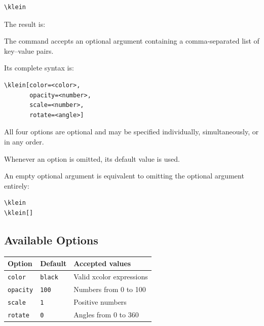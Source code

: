 \documentclass[12pt,a4paper]{article}
\begin{document}
\begin{verbatim}
\klein
\end{verbatim}

The result is:

\begin{center}
    \klein
\end{center}

The command accepts an optional argument containing
a comma-separated list of key--value pairs.

Its complete syntax is:

\begin{verbatim}
\klein[color=<color>,
       opacity=<number>,
       scale=<number>,
       rotate=<angle>]
\end{verbatim}

All four options are optional and may be specified
individually, simultaneously, or in any order.

Whenever an option is omitted, its default value
is used.

An empty optional argument is equivalent to omitting
the optional argument entirely:

\begin{verbatim}
\klein
\klein[]
\end{verbatim}

\begin{center}
    \klein
    \qquad
    \klein[]
\end{center}

\subsection{Available Options}

\begin{center}
\renewcommand{\arraystretch}{1.4}
\begin{tabular}{lll}
\toprule
\textbf{Option}
    & \textbf{Default}
    & \textbf{Accepted values}\\
\midrule
\texttt{color}
    & \texttt{black}
    & Valid xcolor expressions\\
\texttt{opacity}
    & \texttt{100}
    & Numbers from 0 to 100\\
\texttt{scale}
    & \texttt{1}
    & Positive numbers\\
\texttt{rotate}
    & \texttt{0}
    & Angles from 0 to 360\\
\bottomrule
\end{tabular}
\end{center}
\end{document}
